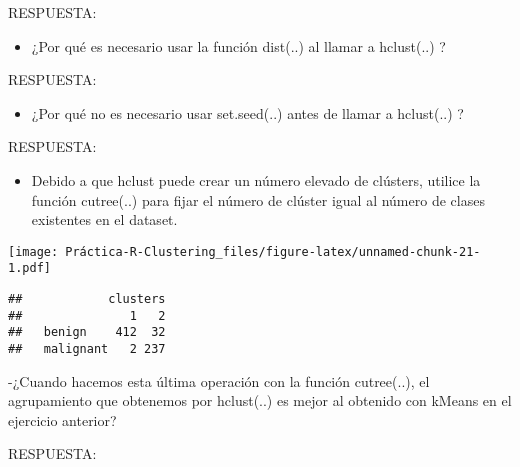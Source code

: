 \documentclass[
]{article}
\newenvironment{Shaded}{\begin{snugshade}}{\end{snugshade}}
\newcommand{\CommentTok}[1]{\textcolor[rgb]{0.56,0.35,0.01}{\textit{#1}}}
\newcommand{\DataTypeTok}[1]{\textcolor[rgb]{0.13,0.29,0.53}{#1}}
\newcommand{\DecValTok}[1]{\textcolor[rgb]{0.00,0.00,0.81}{#1}}
\newcommand{\KeywordTok}[1]{\textcolor[rgb]{0.13,0.29,0.53}{\textbf{#1}}}
\newcommand{\NormalTok}[1]{#1}
\newcommand{\OperatorTok}[1]{\textcolor[rgb]{0.81,0.36,0.00}{\textbf{#1}}}
\newcommand{\StringTok}[1]{\textcolor[rgb]{0.31,0.60,0.02}{#1}}
\providecommand{\tightlist}{%
  \setlength{\itemsep}{0pt}\setlength{\parskip}{0pt}}
\begin{document}
RESPUESTA:

\begin{itemize}
\tightlist
\item
  ¿Por qué es necesario usar la función dist(..) al llamar a hclust(..)
  ?
\end{itemize}

RESPUESTA:

\begin{itemize}
\tightlist
\item
  ¿Por qué no es necesario usar set.seed(..) antes de llamar a
  hclust(..) ?
\end{itemize}

RESPUESTA:

\begin{itemize}
\tightlist
\item
  Debido a que hclust puede crear un número elevado de clústers, utilice
  la función cutree(..) para fijar el número de clúster igual al número
  de clases existentes en el dataset.
\end{itemize}

\begin{Shaded}
\end{Shaded}

\texttt{[image: Práctica-R-Clustering\_files/figure-latex/unnamed-chunk-21-1.pdf]}

\begin{Shaded}
\end{Shaded}

\begin{verbatim}
##            clusters
##               1   2
##   benign    412  32
##   malignant   2 237
\end{verbatim}

-¿Cuando hacemos esta última operación con la función cutree(..), el
agrupamiento que obtenemos por hclust(..) es mejor al obtenido con
kMeans en el ejercicio anterior?

RESPUESTA:
\end{document}
